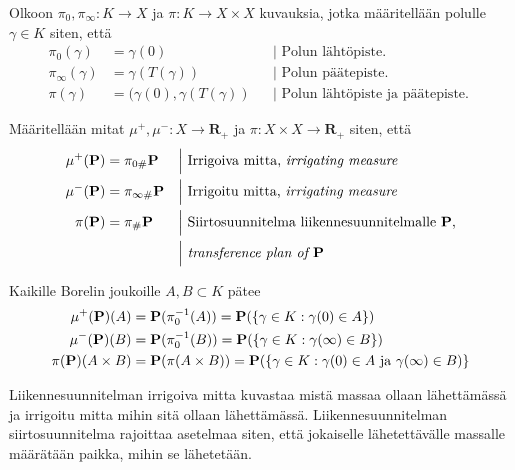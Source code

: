 \begin{definition}
    Olkoon $\pi_0, \pi_\infty: K\to X$ ja $\pi:K\to X \times X$ kuvauksia, jotka määritellään polulle $\gamma \in K$ siten, että 
    \begin{align*}
        \pi_0(\gamma) &= \gamma(0) &&\Big| \text{ Polun lähtöpiste. }\\
        \pi_\infty(\gamma) &= \gamma(T(\gamma)) &&\Big| \text{ Polun päätepiste. }\\
        \pi(\gamma) &= (\gamma(0), \gamma(T(\gamma)) &&\Big| \text{ Polun lähtöpiste ja päätepiste. }
    \end{align*}
\end{definition}

\begin{definition}
    Määritellään mitat $\mu^+, \mu^- : X \to \mathbf{R}_+$ ja $\pi: X\times X \to \mathbf{R}_+$ siten, että
    \begin{align*}
        \mu^+(\P) &= \pi_{0\#} \P  &&\Big| \text{ Irrigoiva mitta, \textit{irrigating measure} }\\
        \mu^-(\P) &= \pi_{\infty \#} \P  &&\Big| \text{ Irrigoitu mitta, \textit{irrigating measure} }\\
        \pi(\P) &= \pi_\# \P  &&\Big| \text{ Siirtosuunnitelma liikennesuunnitelmalle $\P$,}\\ 
        & &&\Big| \text{ \textit{transference plan of $\P$}}
    \end{align*}
\end{definition}

\begin{remark}
    Kaikille Borelin joukoille $A, B \subset K$ pätee
    \begin{align*}
        \mu^+(\P)(A) &= \P(\pi_0^{-1}(A)) = \P(\{\gamma \in K : \gamma(0) \in A\}) \\
        \mu^-(\P)(B) &= \P(\pi_0^{-1}(B)) = \P(\{\gamma \in K : \gamma(\infty) \in B\}) \\
        \pi(\P)(A\times B) &= \P(\pi(A\times B)) = \P(\{\gamma \in K: \gamma(0) \in A\text{ ja } \gamma(\infty) \in B)\}
    \end{align*}
\end{remark}

Liikennesuunnitelman irrigoiva mitta kuvastaa mistä massaa ollaan lähettämässä ja irrigoitu mitta mihin sitä ollaan lähettämässä. Liikennesuunnitelman siirtosuunnitelma rajoittaa asetelmaa siten, että jokaiselle lähetettävälle massalle määrätään paikka, mihin se lähetetään.


